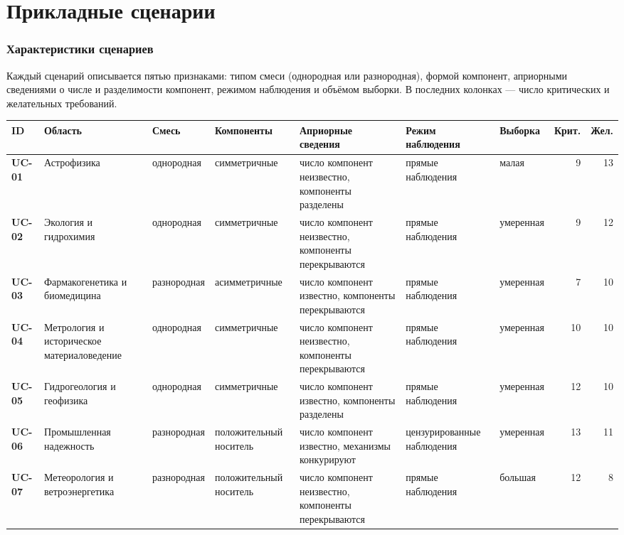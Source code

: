 \documentclass[10pt,a4paper]{article}
\begin{document}
\part{Прикладные сценарии}
\section{Характеристики сценариев}
Каждый сценарий описывается пятью признаками: типом смеси (однородная или разнородная), формой компонент, априорными сведениями о числе и разделимости компонент,
режимом наблюдения и объёмом выборки. В последних колонках --- число критических и желательных требований.
{\scriptsize\setlength{\tabcolsep}{3pt}
\begin{longtable}{@{}l >{\raggedright\arraybackslash}p{2.7cm} >{\raggedright\arraybackslash}p{1.5cm} >{\raggedright\arraybackslash}p{1.9cm} >{\raggedright\arraybackslash}p{3.3cm} >{\raggedright\arraybackslash}p{2.5cm} >{\raggedright\arraybackslash}p{1.6cm} r r@{}}
\toprule
ID & Область & Смесь & Компоненты & Априорные сведения & Режим наблюдения & Выборка & Крит. & Жел. \\
\midrule
\endhead
\textbf{UC-01} & Астрофизика & однородная & симметричные & число компонент неизвестно, компоненты разделены & прямые наблюдения & малая & 9 & 13 \\
\textbf{UC-02} & Экология и гидрохимия & однородная & симметричные & число компонент неизвестно, компоненты перекрываются & прямые наблюдения & умеренная & 9 & 12 \\
\textbf{UC-03} & Фармакогенетика и биомедицина & разнородная & асимметричные & число компонент известно, компоненты перекрываются & прямые наблюдения & умеренная & 7 & 10 \\
\textbf{UC-04} & Метрология и историческое материаловедение & однородная & симметричные & число компонент неизвестно, компоненты перекрываются & прямые наблюдения & умеренная & 10 & 10 \\
\textbf{UC-05} & Гидрогеология и геофизика & однородная & симметричные & число компонент известно, компоненты разделены & прямые наблюдения & умеренная & 12 & 10 \\
\textbf{UC-06} & Промышленная надежность & разнородная & положительный носитель & число компонент известно, механизмы конкурируют & цензурированные наблюдения & умеренная & 13 & 11 \\
\textbf{UC-07} & Метеорология и ветроэнергетика & разнородная & положительный носитель & число компонент неизвестно, компоненты перекрываются & прямые наблюдения & большая & 12 & 8 \\

\end{longtable}}
\end{document}
